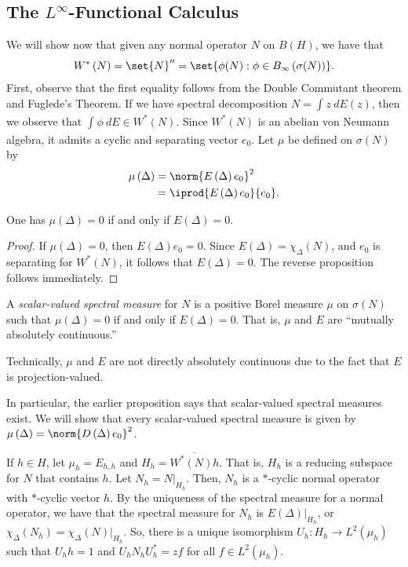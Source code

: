 \documentclass[10pt]{mypackage}
\begin{document}
\subsection{The $L^{\infty}$-Functional Calculus}%
We will show now that given any normal operator $N$ on $B(H)$, we have that
\begin{align*}
  W^{\ast}\left( N \right) = \set{N}'' = \set{\phi(N) : \phi\in B_{\infty}\left( \sigma(N) \right)}.
\end{align*}
First, observe that the first equality follows from the Double Commutant theorem and Fuglede's Theorem. If we have spectral decomposition $ N = \int_{}^{} z\:dE(z) $, then we observe that $ \int_{}^{} \phi\:dE\in W^{\ast}\left( N \right) $. Since $W^{\ast}\left( N \right)$ is an abelian von Neumann algebra, it admits a cyclic and separating vector $e_0$. Let $\mu$ be defined on $\sigma(N)$ by
\begin{align*}
  \mu\left( \Delta \right) &= \norm{E\left( \Delta \right)e_0}^2\\
                           &= \iprod{E\left( \Delta \right)e_0}{e_0}.
\end{align*}
\begin{proposition}
  One has $\mu\left( \Delta \right) = 0$ if and only if $E(\Delta) = 0$.
\end{proposition}
\begin{proof}
  If $\mu\left( \Delta \right) = 0$, then $E\left( \Delta \right)e_0 = 0$. Since $E\left( \Delta \right) = \chi_{\Delta}\left( N \right)$, and $e_0$ is separating for $W^{\ast}\left( N \right)$, it follows that $E\left( \Delta \right) = 0$. The reverse proposition follows immediately.
\end{proof}
\begin{definition}
  A \textit{scalar-valued spectral measure} for $N$ is a positive Borel measure $\mu$ on $\sigma\left( N \right)$ such that $\mu\left( \Delta \right) = 0$ if and only if $E\left( \Delta \right) = 0$. That is, $\mu$ and $E$ are ``mutually absolutely continuous.''
\end{definition}
Technically, $\mu$ and $E$ are not directly absolutely continuous due to the fact that $E$ is projection-valued.

In particular, the earlier proposition says that scalar-valued spectral measures exist. We will show that every scalar-valued spectral measure is given by $\mu\left( \Delta \right) = \norm{D\left( \Delta \right)e_0}^2$.

If $h\in H$, let $\mu_{h} = E_{h,h}$ and $H_{h} = \overline{W^{\ast}\left( N \right)h}$. That is, $H_h$ is a reducing subspace for $N$ that contains $h$. Let $N_h = N|_{H_h}$. Then, $N_{h}$ is a $\ast$-cyclic normal operator with $\ast$-cyclic vector $h$. By the uniqueness of the spectral measure for a normal operator, we have that the spectral measure for $N_h$ is $E\left( \Delta \right)|_{H_h}$, or $\chi_{\Delta}\left( N_h \right) = \chi_{\Delta}\left( N \right)|_{H_h}$. So, there is a unique isomorphism $U_h\colon H_h\to L^2\left( \mu_h \right)$ such that $U_hh = 1$ and $U_{h}N_hU_h^{\ast} = zf$ for all $f\in L^2\left( \mu_h \right)$.
\end{document}
